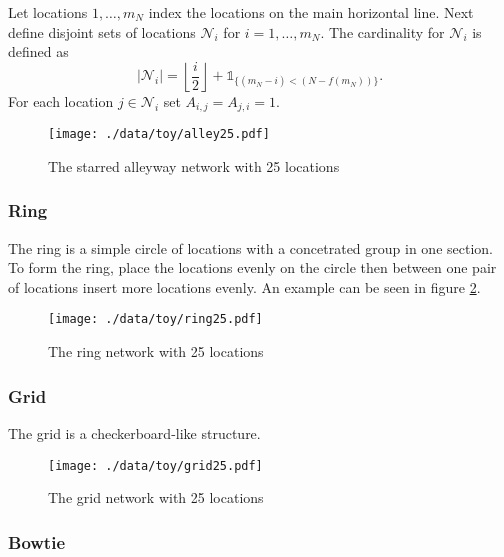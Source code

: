 \documentclass[11pt]{article}
\begin{document}
Let locations $1,\ldots,m_N$ index the locations on the main
horizontal line.  Next define disjoint sets of locations
$\mathcal{N}_i$ for $i = 1,\ldots,m_N$.  The cardinality for
$\mathcal{N}_i$ is defined as
\begin{equation*}
  | \mathcal{N}_i | = \left\lfloor \frac{i}{2} \right\rfloor +
  \mathds{1}_{\lbrace(m_N - i) < (N - f(m_N))\rbrace}.
\end{equation*}
For each location $j \in \mathcal{N}_i$ set $A_{i,j} = A_{j,i} = 1$.


\begin{figure}[htb]
\centering
\texttt{[image: ./data/toy/alley25.pdf]}
\caption{\label{fig:alley25}The starred alleyway network with 25 locations}
\end{figure}



\subsubsection{Ring}
\label{sec-1-3-3}

The ring is a simple circle of locations with a concetrated group in one
section.  To form the ring, place the locations evenly on the circle
then between one pair of locations insert more locations evenly.  An
example can be seen in figure \ref{fig:ring25}.

\begin{figure}[htb]
\centering
\texttt{[image: ./data/toy/ring25.pdf]}
\caption{\label{fig:ring25}The ring network with 25 locations}
\end{figure}




\subsubsection{Grid}
\label{sec-1-3-4}

The grid is a checkerboard-like structure.

\begin{figure}[htb]
\centering
\texttt{[image: ./data/toy/grid25.pdf]}
\caption{\label{fig:grid25}The grid network with 25 locations}
\end{figure}



\subsubsection{Bowtie}
\label{sec-1-3-5}
\end{document}
